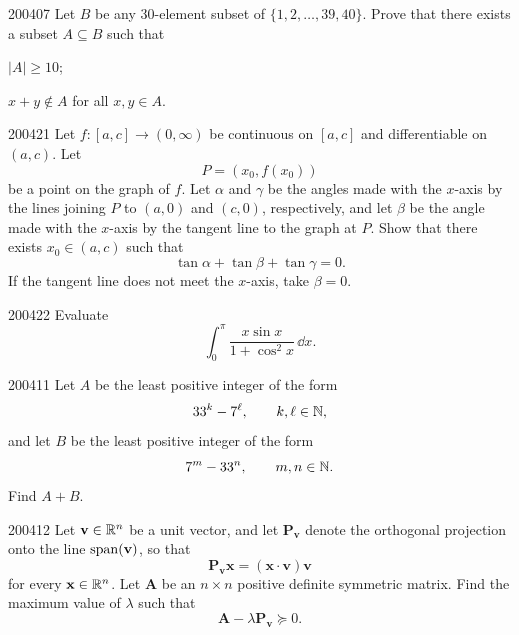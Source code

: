 \begin{problem}{2004}{0}{7}
Let $B$ be any $30$-element subset of $\{1, 2, \dots, 39, 40\}$. Prove that there exists a subset $A\subseteq B$ such that
\begin{problemclauses}
    \item $|A|\ge10$;
    \item $x+y\notin A$ for all $x, y\in A$.
\end{problemclauses}
\end{problem}

\begin{problem}{2004}{2}{1}
Let $f\colon[a, c]\to(0, \infty)$ be continuous on $[a, c]$ and differentiable on $(a, c)$. Let
\[
    P=(x_0, f(x_0))
\]
be a point on the graph of $f$. Let $\alpha$ and $\gamma$ be the angles made with the $x$-axis by the lines joining $P$ to $(a, 0)$ and $(c, 0)$, respectively, and let $\beta$ be the angle made with the $x$-axis by the tangent line to the graph at $P$. Show that there exists $x_0\in(a, c)$ such that
\[
    \tan\alpha+\tan\beta+\tan\gamma=0.
\]
If the tangent line does not meet the $x$-axis, take $\beta=0$.
\end{problem}

\begin{problem}{2004}{2}{2}
Evaluate
\[
    \int_0^{\pi}\frac{x\sin x}{1+\cos^2x}\, \dd x.
\]
\end{problem}

\begin{problem}{2004}{1}{1}
Let $A$ be the least positive integer of the form
\[
    33^k-7^\ell,
    \qquad k, \ell\in\mathbb{N},
\]
and let $B$ be the least positive integer of the form
\[
    7^m-33^n,
    \qquad m, n\in\mathbb{N}.
\]
Find $A+B$.
\end{problem}

\begin{problem}{2004}{1}{2}
Let $\mathbf v\in\mathbb{R}^n$ be a unit vector, and let $\mathbf P_{\mathbf v}$ denote the orthogonal projection onto the line $\operatorname{span}(\mathbf v)$, so that
\[
    \mathbf P_{\mathbf v}\mathbf x=(\mathbf x\cdot\mathbf v)\mathbf v
\]
for every $\mathbf x\in\mathbb{R}^n$. Let $\mathbf A$ be an $n\times n$ positive definite symmetric matrix. Find the maximum value of $\lambda$ such that
\[
    \mathbf A-\lambda\mathbf P_{\mathbf v}\succeq0.
\]
\end{problem}
